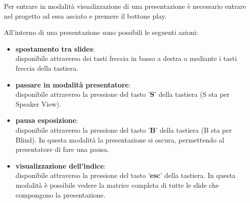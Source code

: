 \noindent
Per entrare in modalità visualizzazione di una presentazione è necessario entrare nel progetto ad essa asciato e premere il bottone play. 

All'interno di una presentazione sono possibili le seguenti azioni:

\begin{itemize}
 \item \textbf{spostamento tra slides}: \\disponibile attraverso dei tasti freccia in basso a destra o mediante i tasti freccia della tastiera.
 \item \textbf{passare in modalità presentatore}: \\disponibile attraverso la pressione del tasto '\textbf{S}' della tastiera (S sta per Speaker View).
  \item \textbf{pausa esposizione}: \\disponibile attraverso la pressione del tasto '\textbf{B}' della tastiera (B sta per Blind). In questa modalità la presentazione si oscura, permettendo al presentatore di fare una pausa.
  \item \textbf{visualizzazione dell'indice}: \\disponibile attraverso la pressione del tasto '\textbf{esc}' della tastiera. In questa modalità è possibile vedere la matrice completa di tutte le slide che compongono la presentazione.

  \end{itemize}
